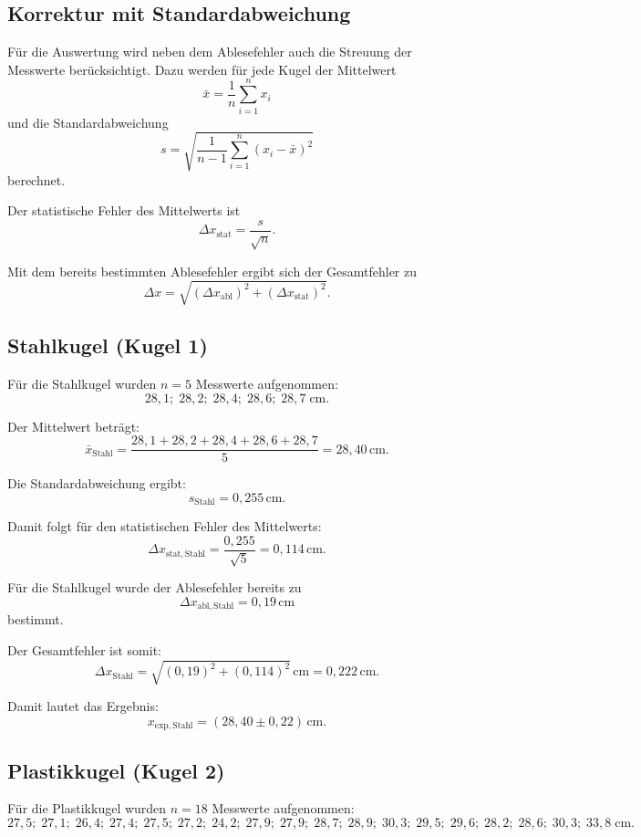 \documentclass{article}
\begin{document}
\subsection{Korrektur mit Standardabweichung}

Für die Auswertung wird neben dem Ablesefehler auch die Streuung der Messwerte berücksichtigt. 
Dazu werden für jede Kugel der Mittelwert
\[
\bar{x}=\frac{1}{n}\sum_{i=1}^{n}x_i
\]
und die Standardabweichung
\[
s=\sqrt{\frac{1}{n-1}\sum_{i=1}^{n}(x_i-\bar{x})^2}
\]
berechnet. 

Der statistische Fehler des Mittelwerts ist
\[
\Delta x_{\mathrm{stat}}=\frac{s}{\sqrt{n}}.
\]

Mit dem bereits bestimmten Ablesefehler ergibt sich der Gesamtfehler zu
\[
\Delta x=\sqrt{(\Delta x_{\mathrm{abl}})^2+(\Delta x_{\mathrm{stat}})^2}.
\]

\subsection*{Stahlkugel (Kugel 1)}
Für die Stahlkugel wurden \(n=5\) Messwerte aufgenommen:
\[
28{,}1;\;28{,}2;\;28{,}4;\;28{,}6;\;28{,}7\;\mathrm{cm}.
\]

Der Mittelwert beträgt:
\[
\bar{x}_{\mathrm{Stahl}}=\frac{28{,}1+28{,}2+28{,}4+28{,}6+28{,}7}{5}
=28{,}40\,\mathrm{cm}.
\]

Die Standardabweichung ergibt:
\[
s_{\mathrm{Stahl}}=0{,}255\,\mathrm{cm}.
\]

Damit folgt für den statistischen Fehler des Mittelwerts:
\[
\Delta x_{\mathrm{stat,Stahl}}
=\frac{0{,}255}{\sqrt{5}}
=0{,}114\,\mathrm{cm}.
\]

Für die Stahlkugel wurde der Ablesefehler bereits zu
\[
\Delta x_{\mathrm{abl,Stahl}}=0{,}19\,\mathrm{cm}
\]
bestimmt.

Der Gesamtfehler ist somit:
\[
\Delta x_{\mathrm{Stahl}}
=\sqrt{(0{,}19)^2+(0{,}114)^2}\,\mathrm{cm}
=0{,}222\,\mathrm{cm}.
\]

Damit lautet das Ergebnis:
\[
x_{\mathrm{exp,Stahl}}=(28{,}40\pm0{,}22)\,\mathrm{cm}.
\]

\subsection*{Plastikkugel (Kugel 2)}
Für die Plastikkugel wurden \(n=18\) Messwerte aufgenommen:
\[
27{,}5;\;27{,}1;\;26{,}4;\;27{,}4;\;27{,}5;\;27{,}2;\;24{,}2;\;27{,}9;\;27{,}9;\;28{,}7;\;28{,}9;\;30{,}3;\;29{,}5;\;29{,}6;\;28{,}2;\;28{,}6;\;30{,}3;\;33{,}8\;\mathrm{cm}.
\]
\end{document}
